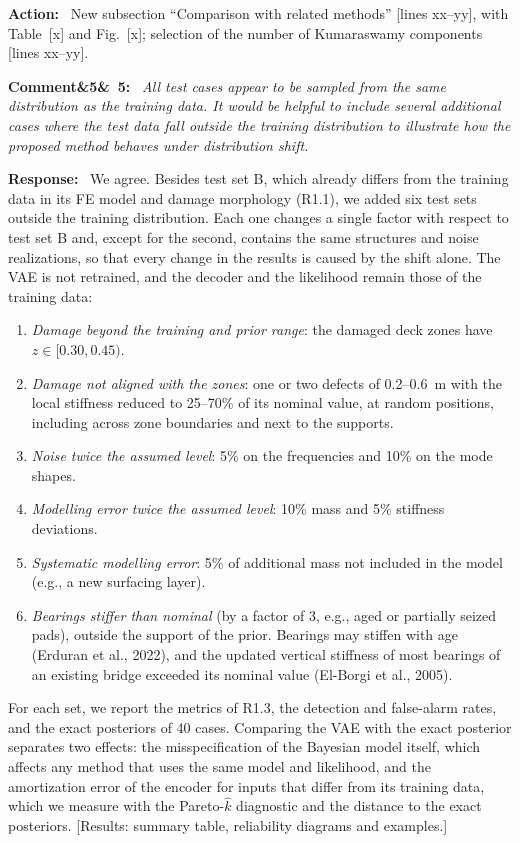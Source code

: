 \documentclass[11pt]{article}
\newenvironment{rcomment}[1]{\par\bigskip\noindent\textbf{Comment\ifx&#1&\else\ #1\fi:}\ \itshape}{\par}
\newenvironment{response}{\par\smallskip\noindent\color{resp}\textbf{Response:}\ }{\par}
\newenvironment{action}{\par\smallskip\noindent\color{resp}\textbf{Action:}\ }{\par}
\newcommand{\tbd}[1]{\textcolor{note}{\textsf{[#1]}}}
\newcommand{\lines}[1]{\tbd{lines #1}}
\begin{document}
\begin{action}
New subsection ``Comparison with related methods'' \lines{xx--yy}, with Table~\tbd{x} and Fig.~\tbd{x}; selection of
the number of Kumaraswamy components \lines{xx--yy}.
\end{action}

\begin{rcomment}{5}
All test cases appear to be sampled from the same distribution as the training data. It would be helpful to include
several additional cases where the test data fall outside the training distribution to illustrate how the proposed
method behaves under distribution shift.
\end{rcomment}

\begin{response}
We agree. Besides test set B, which already differs from the training data in its FE model and damage morphology (R1.1),
we added six test sets outside the training distribution. Each one changes a single factor with respect to test set B
and, except for the second, contains the same structures and noise realizations, so that every change in the results is
caused by the shift alone. The VAE is not retrained, and the decoder and the likelihood remain those of the training
data:
\begin{enumerate}[leftmargin=*]
\item \emph{Damage beyond the training and prior range}: the damaged deck zones have $z\in[0.30,0.45)$.
\item \emph{Damage not aligned with the zones}: one or two defects of 0.2--0.6~m with the local stiffness reduced to
25--70\% of its nominal value, at random positions, including across zone boundaries and next to the supports.
\item \emph{Noise twice the assumed level}: 5\% on the frequencies and 10\% on the mode shapes.
\item \emph{Modelling error twice the assumed level}: 10\% mass and 5\% stiffness deviations.
\item \emph{Systematic modelling error}: 5\% of additional mass not included in the model (e.g., a new surfacing layer).
\item \emph{Bearings stiffer than nominal} (by a factor of 3, e.g., aged or partially seized pads), outside the support of
the prior. Bearings may stiffen with age (Erduran et al., 2022), and the updated vertical stiffness of most bearings of
an existing bridge exceeded its nominal value (El-Borgi et al., 2005).
\end{enumerate}
For each set, we report the metrics of R1.3, the detection and false-alarm rates, and the exact posteriors of 40 cases.
Comparing the VAE with the exact posterior separates two effects: the misspecification of the Bayesian model itself,
which affects any method that uses the same model and likelihood, and the amortization error of the encoder for inputs
that differ from its training data, which we measure with the Pareto-$\hat{k}$ diagnostic and the distance to the exact
posteriors.
\tbd{Results: summary table, reliability diagrams and examples.}
\end{response}
\end{document}
